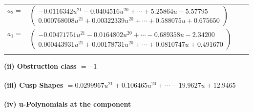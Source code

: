 \documentclass[1p]{elsarticle_modified}
\theoremstyle{definition}
\begin{document}
\begin{tabular}{m{7pt} m{180pt} m{7pt} m{180pt} }
\flushright $a_{2}=$&$\begin{pmatrix}-0.0116342 u^{21}-0.0404516 u^{20}+\cdots+5.25864 u-5.57795\\0.000768008 u^{21}+0.00322339 u^{20}+\cdots+0.588075 u+0.675650\end{pmatrix}$ \\
\flushright $a_{1}=$&$\begin{pmatrix}-0.00471751 u^{21}-0.0164802 u^{20}+\cdots-0.689358 u-2.34200\\0.000443931 u^{21}+0.00178731 u^{20}+\cdots+0.0810747 u+0.491670\end{pmatrix}$\\&\end{tabular}
\flushleft \textbf{(ii) Obstruction class $= -1$}\\~\\
\flushleft \textbf{(iii) Cusp Shapes $= 0.0299967 u^{21}+0.106465 u^{20}+\cdots-19.9627 u+12.9465$}\\~\\
\newpage\renewcommand{\arraystretch}{1}
\flushleft \textbf{(iv) u-Polynomials at the component}\newline \\
\end{document}
